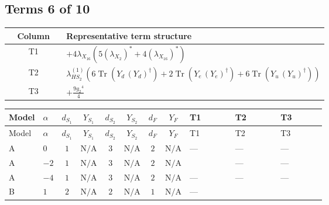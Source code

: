\documentclass[8pt]{article}
\begin{document}
\begin{landscape}
\subsection*{Terms 6 of 10}
\begin{center}
\begin{tabular}{@{}c >{\raggedright\arraybackslash}p{0.82\linewidth}@{}}
\toprule
Column & Representative term structure \\
\midrule
T1 & \(\displaystyle +4 {\lambda_{X_{16}}} (5 \left({\lambda_{X_{2}}}\right)^{*}+4 \left({\lambda_{X_{16}}}\right)^{*})\) \\
\midrule
T2 & \(\displaystyle {\lambda_{HS_2}^{(1)}} (6 \operatorname{Tr}\!\left({Y_d}\,\left({Y_d}\right)^{\dagger}\right)+2 \operatorname{Tr}\!\left({Y_e}\,\left({Y_e}\right)^{\dagger}\right)+6 \operatorname{Tr}\!\left({Y_u}\,\left({Y_u}\right)^{\dagger}\right))\) \\
\midrule
T3 & \(\displaystyle +\frac{9 {g_2}^4}{4}\) \\
\midrule
\bottomrule
\end{tabular}
\end{center}
\smallskip
\tiny
\begin{longtable}{@{}llcccccc >{\raggedright\arraybackslash}p{0.21\linewidth} >{\raggedright\arraybackslash}p{0.21\linewidth} >{\raggedright\arraybackslash}p{0.21\linewidth}@{}}
\toprule
Model & $\alpha$ & $d_{S_1}$ & $Y_{S_1}$ & $d_{S_2}$ & $Y_{S_2}$ & $d_F$ & $Y_F$ & T1 & T2 & T3 \\
\midrule
\endfirsthead
\toprule
Model & $\alpha$ & $d_{S_1}$ & $Y_{S_1}$ & $d_{S_2}$ & $Y_{S_2}$ & $d_F$ & $Y_F$ & T1 & T2 & T3 \\
\midrule
\endhead
A & $0$ & $1$ & $\text{N/A}$ & $3$ & $\text{N/A}$ & $2$ & $\text{N/A}$ & --- & --- & --- \\
\midrule
A & $-2$ & $1$ & $\text{N/A}$ & $3$ & $\text{N/A}$ & $2$ & $\text{N/A}$ & \scriptsize\adjustbox{max width=\linewidth}{$\begin{gathered} +4 {\lambda_{X_{16}}} (5 \left({\lambda_{X_{2}}}\right)^{*}+4 \left({\lambda_{X_{16}}}\right)^{*})\end{gathered}$} & --- & --- \\
\midrule
A & $-4$ & $1$ & $\text{N/A}$ & $3$ & $\text{N/A}$ & $2$ & $\text{N/A}$ & --- & --- & --- \\
\midrule
B & $1$ & $2$ & $\text{N/A}$ & $2$ & $\text{N/A}$ & $1$ & $\text{N/A}$ & --- & \scriptsize\adjustbox{max width=\linewidth}{$\begin{gathered} {\lambda_{HS_2}^{(1)}} (6 \operatorname{Tr}\!\left({Y_d}\,\left({Y_d}\right)^{\dagger}\right)+2 \operatorname{Tr}\!\left({Y_e}\,\left({Y_e}\right)^{\dagger}\right)+6 \operatorname{Tr}\!\left({Y_u}\,\left({Y_u}\right)^{\dagger}\right))\end{gathered}$} & \scriptsize\adjustbox{max width=\linewidth}{$\begin{gathered} +\frac{9 {g_2}^4}{4}\end{gathered}$} \\

\end{longtable}
\end{landscape}
\end{document}
